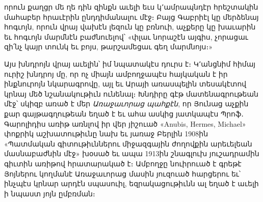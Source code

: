 \documentclass{article}
\begin{document}
{որուն քաղցր մե ղե դին զինքն աւելի եւս կ՚ամրապնդէր հրեշտակին մահաբեր հրաւէրին ընդդիմանալու մէջ։ Բայց Գաբրիէլ կը մերձենայ հոգւոյն, որուն վրայ վախէն լեզուն կը բռնուի, աչքերը կը խաւարին եւ հոգւոյն մարմնէն բաժնուելով՝ «փլաւ նորաշէն այգիս, չորացաւ զի՛նչ կայր տունկ եւ բոյս, թարշամեցաւ գեղ մարմնոյս։»

Այս խնդրոյն վրայ աւելին՝ իմ նպատակէս դուրս է։ Կ՚անցնիմ հիմայ ուրիշ խնդրոյ մը, որ ոչ միայն ամբողջապէս հայկական է իր ինքնուրոյն նկարագրովը, այլ եւ Արայի առասպելին տեսակէտով կրնայ մեծ նշանակութիւն ունենալ։ Խնդիրը գէթ մատենագրութեան մէջ՝ սկիզբ առած է մեր \emph{Առաջաւորաց պահքէն}, որ Յունաց աչքին քար գայթագղութեան եղած է եւ ահա ասկից յատկապէս Պրոֆ․ Գարոլիդիս առիթ առնլով իր վեր յիշուած «Anubis, Hermes, Michael» փոքրիկ աշխատութիւնը նախ եւ յառաջ Բերլին 1908ին «Պատմական գիտութիւններու միջազգային ժողովքին արեւելեան մասնաբաժնին մէջ» խօսած եւ ապա 1913ին շնագլուխ յուշադրամին գիւտին առիթով հրատարակած է։ Ամբողջը նուիրուած է գրեթէ Յոյներու կողմանէ Առաջաւորաց մասին յուզուած հարցերու եւ՝ ինչպէս կրնար արդէն սպասուիլ, եզրակացութիւնն ալ եղած է աւելի ի նպաստ յոյն ըմբռման։

}
\end{document}
